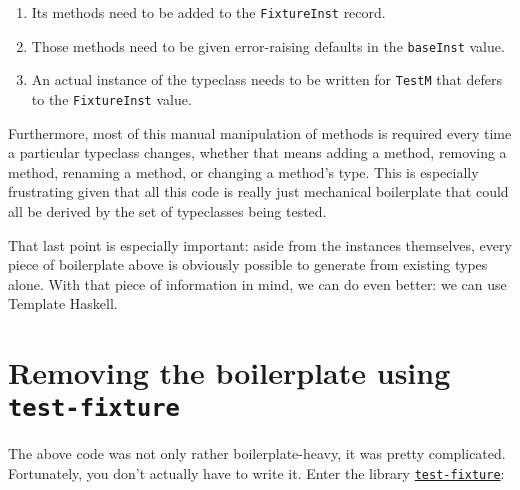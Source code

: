 \begin{enumerate}

\item
  Its methods need to be added to the \texttt{FixtureInst} record.
\item
  Those methods need to be given error-raising defaults in the
  \texttt{baseInst} value.
\item
  An actual instance of the typeclass needs to be written for
  \texttt{TestM} that defers to the \texttt{FixtureInst} value.
\end{enumerate}
Furthermore, most of this manual manipulation of methods is required
every time a particular typeclass changes, whether that means adding a
method, removing a method, renaming a method, or changing a method's
type. This is especially frustrating given that all this code is really
just mechanical boilerplate that could all be derived by the set of
typeclasses being tested.

That last point is especially important: aside from the instances
themselves, every piece of boilerplate above is obviously possible to
generate from existing types alone. With that piece of information in
mind, we can do even better: we can use Template Haskell.

\hypertarget{removing-the-boilerplate-using-test-fixture}{%
\section{\texorpdfstring{Removing the boilerplate using
\texttt{test-fixture}}{Removing the boilerplate using test-fixture}}
\label{removing-the-boilerplate-using-test-fixture}}

The above code was not only rather boilerplate-heavy, it was pretty
complicated. Fortunately, you don't actually have to write it. Enter the
library
\href{http://hackage.haskell.org/package/test-fixture}{\texttt{test-fixture}}:

